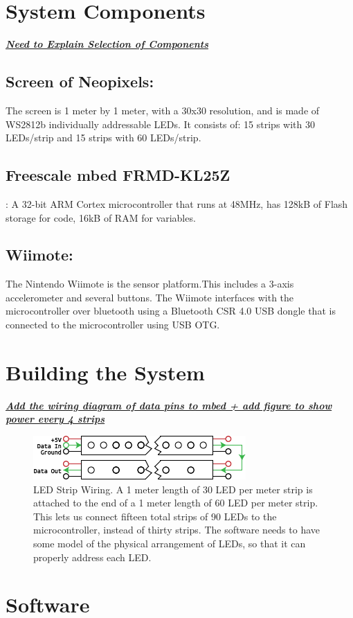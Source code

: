 \documentclass{tufte-handout}
\begin{document}
\section{\textbf{System Components}}
\underline{\textit{\textbf{Need to Explain Selection of Components}}}
\subsection{Screen of Neopixels:}
The screen is 1 meter by 1 meter, with a 30x30 resolution, and
is made of WS2812b individually addressable LEDs. It consists of: 15 strips with 30 LEDs/strip and 15 strips with 60 LEDs/strip.
\subsection{Freescale mbed FRMD-KL25Z}:
A 32-bit ARM Cortex microcontroller that runs at 48MHz, has 128kB of Flash storage for code, 16kB of RAM for variables.
\subsection{Wiimote:}
The Nintendo Wiimote is the sensor platform.This includes a 3-axis accelerometer and several buttons. The Wiimote interfaces with the microcontroller over bluetooth using a Bluetooth CSR 4.0 USB dongle that is connected to the microcontroller using USB OTG.
\section{\textbf{Building the System}}
\underline{\textbf{\textit{Add the wiring diagram of data pins to mbed + add figure to show power every 4 strips }}}
\begin{figure}
    \includegraphics{Wiring_Diagram.png}
    \caption{LED Strip Wiring. A 1 meter length of 30 LED per meter strip is
    attached to the end of a 1 meter length of 60 LED per meter strip. This
lets us connect fifteen total strips of 90 LEDs to the microcontroller,
instead of thirty strips. The software needs to have some model of the
physical arrangement of LEDs, so that it can properly address each LED.}
\end{figure}
\section{\textbf{Software}}
\end{document}
